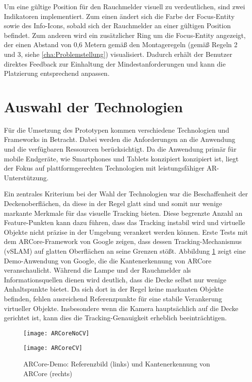Um eine gültige Position für den Rauchmelder visuell zu verdeutlichen, sind zwei Indikatoren implementiert. Zum einen ändert sich die Farbe der Focus-Entity sowie des Info-Icons, sobald sich der Rauchmelder an einer gültigen Position befindet. Zum anderen wird ein zusätzlicher Ring um die Focus-Entity angezeigt, der einen Abstand von 0,6 Metern gemäß den Montageregeln (gemäß Regeln 2 und 3, siehe \ref{cha:Problemstellung}) visualisiert. Dadurch erhält der Benutzer direktes Feedback zur Einhaltung der Mindestanforderungen und kann die Platzierung entsprechend anpassen.

\section{Auswahl der Technologien}

Für die Umsetzung des Prototypen kommen verschiedene Technologien und Frameworks in Betracht. Dabei werden die Anforderungen an die Anwendung und die verfügbaren Ressourcen berücksichtigt. Da die Anwendung primär für mobile Endgeräte, wie Smartphones und Tablets konzipiert konzipiert ist, liegt der Fokus auf plattformgerechten Technologien mit leistungsfähiger AR-Unterstützung.

Ein zentrales Kriterium bei der Wahl der Technologien war die Beschaffenheit der Deckenoberflächen, da diese in der Regel glatt sind und somit nur wenige markante Merkmale für das visuelle Tracking bieten. Diese begrenzte Anzahl an Feature-Punkten kann dazu führen, dass das Tracking instabil wird und virtuelle Objekte nicht präzise in der Umgebung verankert werden können. Erste Tests mit dem ARCore-Framework von Google zeigen, dass dessen Tracking-Mechanismus (vSLAM) auf glatten Oberflächen an seine Grenzen stößt. Abbildung \ref{fig:ARCore} zeigt eine Demo-Anwendung von Google, die die Kantenerkennung von ARCore veranschaulicht. Während die Lampe und der Rauchmelder als Informationsquellen dienen wird deutlich, dass die Decke selbst nur wenige Anhaltspunkte bietet. Da sich dort in der Regel keine markanten Objekte befinden, fehlen ausreichend Referenzpunkte für eine stabile Verankerung virtueller Objekte. Insbesondere wenn die Kamera hauptsächlich auf die Decke gerichtet ist, kann dies die Tracking-Genauigkeit erheblich beeinträchtigen.

\begin{figure}[ht]
    \centering
    \begin{minipage}{0.45\textwidth}
        \centering
        \texttt{[image: ARCoreNoCV]}
    \end{minipage}
    \hfill
    \begin{minipage}{0.45\textwidth}
        \centering
        \texttt{[image: ARCoreCV]}
    \end{minipage}
    \caption{ARCore-Demo: Referenzbild (links) und Kantenerkennung von ARCore (rechts)}
    \label{fig:ARCore}
\end{figure}

